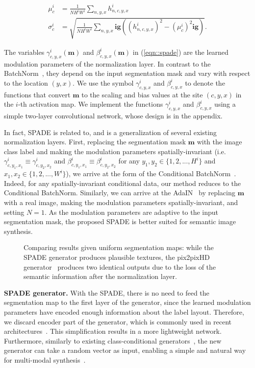 \begin{align}
\mu^i_c &= \frac{1}{N H^i W^i}\sum_{n,y,x} h^i_{n,c,y,x}\\
\sigma^i_c &= \sqrt{\frac{1}{N H^i W^i}\sum_{n,y,x} \mathbf{ig}( (h^i_{n,c,y,x})^2 - (\mu^i_c)^2 \mathbf{ig}) }.
\end{align}

The variables $\gamma^i_{c,y,x}(\mathbf{m})$ and $\beta^i_{c,y,x}(\mathbf{m})$ in (\ref{eqn::spade}) are the learned modulation parameters of the normalization layer. In contrast to the BatchNorm~\cite{ioffe2015batch}, they depend on the input segmentation mask and vary with respect to the location $(y, x)$. We use the symbol $\gamma^i_{c,y,x}$ and $\beta^i_{c,y,x}$ to denote the functions that convert $\mathbf{m}$ to the scaling and bias values at the site $(c,y,x)$ in the $i$-th activation map. We implement the functions $\gamma^i_{c,y,x}$ and $\beta^i_{c,y,x}$ using a simple two-layer convolutional network, whose design is in the appendix.

In fact, SPADE is related to, and is a generalization of several existing normalization layers. First, replacing the segmentation mask $\mathbf{m}$ with the image class label and making the modulation parameters spatially-invariant (i.e. $\gamma^i_{c,y_1,x_1}\equiv \gamma^i_{c,y_2,x_2}$ and $\beta^i_{c,y_1,x_1}\equiv \beta^i_{c,y_2,x_2}$ for any $y_1,y_2 \in \{1,2,...,H^i\}$ and $x_1,x_2 \in \{1,2,...,W^i\}$), we arrive at the form of the Conditional BatchNorm~\cite{dumoulin2016learned}. Indeed, for any spatially-invariant conditional data, our method reduces to the Conditional BatchNorm. Similarly, we can arrive at the AdaIN~\cite{huang2017adain} by replacing $\mathbf{m}$ with a real image, making the modulation parameters spatially-invariant, and setting $N=1$. As the modulation parameters are adaptive to the input segmentation mask, the proposed SPADE is better suited for semantic image synthesis.

\begin{figure}
	\centering

	\caption{Comparing results given uniform segmentation maps: while the SPADE generator produces plausible textures, the pix2pixHD generator~\cite{wang2018pix2pixHD} produces two identical outputs due to the loss of the semantic information after the normalization layer.}
	\label{fig::uniform_label}

\end{figure}

{\bf SPADE generator.} With the SPADE, there is no need to feed the segmentation map to the first layer of the generator, since the learned modulation parameters have encoded enough information about the label layout. Therefore, we discard encoder part of the generator, which is commonly used in recent architectures~\cite{wang2018pix2pixHD,isola2017image}. This simplification results in a more lightweight network. Furthermore, similarly to existing class-conditional generators~\cite{miyato2018cgans,zhang2018self,mescheder2018training}, the new generator can take a random vector as input, enabling a simple and natural way for multi-modal synthesis~\cite{zhu2017toward,huang2018multimodal}. 

